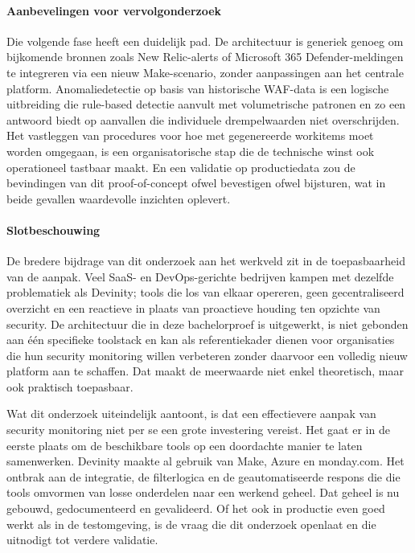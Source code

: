 \paragraph{Aanbevelingen voor vervolgonderzoek}
Die volgende fase heeft een duidelijk pad. De architectuur is generiek genoeg om bijkomende bronnen zoals New Relic-alerts of Microsoft 365 Defender-meldingen te integreren via een nieuw Make-scenario, zonder aanpassingen aan het centrale platform. Anomaliedetectie op basis van historische WAF-data is een logische uitbreiding die rule-based detectie aanvult met volumetrische patronen en zo een antwoord biedt op aanvallen die individuele drempelwaarden niet overschrijden. Het vastleggen van procedures voor hoe met gegenereerde workitems moet worden omgegaan, is een organisatorische stap die de technische winst ook operationeel tastbaar maakt. En een validatie op productiedata zou de bevindingen van dit proof-of-concept ofwel bevestigen ofwel bijsturen, wat in beide gevallen waardevolle inzichten oplevert.

\paragraph{Slotbeschouwing}
De bredere bijdrage van dit onderzoek aan het werkveld zit in de toepasbaarheid van de aanpak. Veel SaaS- en DevOps-gerichte bedrijven kampen met dezelfde problematiek als Devinity; tools die los van elkaar opereren, geen gecentraliseerd overzicht en een reactieve in plaats van proactieve houding ten opzichte van security. De architectuur die in deze bachelorproef is uitgewerkt, is niet gebonden aan één specifieke toolstack en kan als referentiekader dienen voor organisaties die hun security monitoring willen verbeteren zonder daarvoor een volledig nieuw platform aan te schaffen. Dat maakt de meerwaarde niet enkel theoretisch, maar ook praktisch toepasbaar.

Wat dit onderzoek uiteindelijk aantoont, is dat een effectievere aanpak van security monitoring niet per se een grote investering vereist. Het gaat er in de eerste plaats om de beschikbare tools op een doordachte manier te laten samenwerken. Devinity maakte al gebruik van Make, Azure en monday.com. Het ontbrak aan de integratie, de filterlogica en de geautomatiseerde respons die die tools omvormen van losse onderdelen naar een werkend geheel. Dat geheel is nu gebouwd, gedocumenteerd en gevalideerd. Of het ook in productie even goed werkt als in de testomgeving, is de vraag die dit onderzoek openlaat en die uitnodigt tot verdere validatie.

